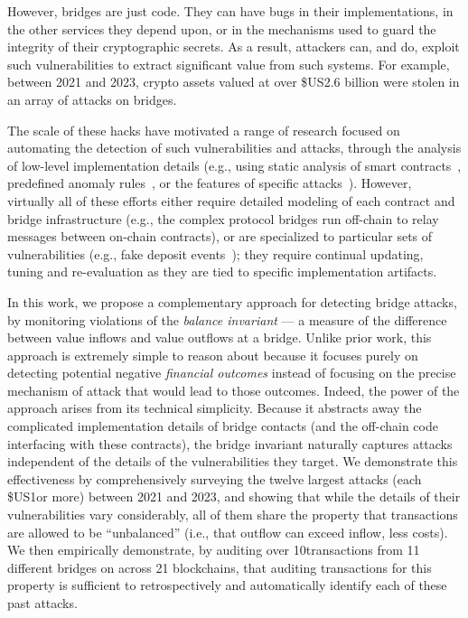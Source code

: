 However, bridges are just code.  They can have bugs in their
implementations, in the other services they depend upon, or in the
mechanisms used to guard the integrity of their cryptographic secrets.
As a result, attackers can, and do, exploit such vulnerabilities to
extract significant value from such systems.  For example, between
2021 and 2023, crypto assets valued at over \$US2.6 billion were
stolen in an array of attacks on bridges. 

The scale of these hacks have motivated a range of research
focused on automating the detection of such vulnerabilities and
attacks, through the analysis of low-level implementation details
(e.g., using static analysis of smart
contracts~\cite{wang2024xguard,liao2024smartaxe}, predefined anomaly
rules~\cite{zhang2022xscope}, or the features of specific
attacks~\cite{lin2024detecting}).  However, virtually all of these
efforts either require detailed modeling of each contract and bridge infrastructure (e.g.,
the complex protocol bridges run off-chain to relay messages between on-chain contracts),
or are specialized to particular sets of vulnerabilities (e.g., fake deposit events~\cite{lin2024detecting}); they require
continual updating, tuning and re-evaluation as they are tied to
specific implementation artifacts.

In this work, we propose a complementary approach for detecting bridge
attacks, by monitoring violations of the \emph{balance invariant}
--- a measure of the difference between value inflows and value
outflows at a bridge. Unlike prior work, this approach is extremely
simple to reason about because it focuses purely on detecting
potential negative \emph{financial outcomes} instead of focusing on
the precise mechanism of attack that would lead to those outcomes.
Indeed, the power of the approach arises from its technical
simplicity.  Because it abstracts away the complicated implementation
details of bridge contacts (and the off-chain code interfacing with these contracts), the bridge invariant naturally captures 
attacks independent of the details of the vulnerabilities
they target.  We demonstrate this effectiveness by comprehensively
surveying the twelve largest attacks (each \$US1\mil or more) between
2021 and 2023, and showing that while the details of their
vulnerabilities vary considerably, all of them share the property that
transactions are allowed to be ``unbalanced'' (i.e., that outflow can
exceed inflow, less costs).
We then empirically demonstrate, by auditing over 10\mil transactions from 11 different bridges on across 21 blockchains, that auditing transactions for this
property is sufficient to retrospectively and automatically identify
each of these past attacks.  

